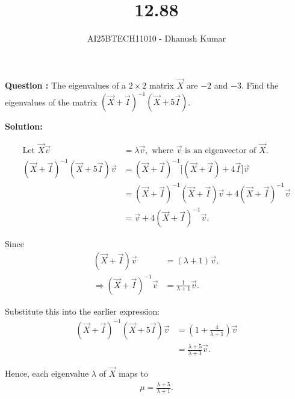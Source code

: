 \documentclass[journal]{IEEEtran}
\begin{document}
\title{12.88}
\author{AI25BTECH11010 - Dhanush Kumar}
\maketitle
\renewcommand{\thefigure}{\theenumi}
\renewcommand{\thetable}{\theenumi}

\textbf{Question :}  
The eigenvalues of a $2 \times 2$ matrix $\vec{X}$ are $-2$ and $-3$.  
Find the eigenvalues of the matrix $(\vec{X} + \vec{I})^{-1}(\vec{X} + 5\vec{I})$.
\begin{enumerate}[label=(\alph*)]}
		\begin{multicols}{2}
    \item $-3, -4$
    \item $-1, -2$
    \item $-1, -3$
    \item $-2, -4$
 \end{multicols}
\end{enumerate}

\textbf{Solution:}

\begin{align}
\text{Let } \vec{X}\vec{v} &= \lambda \vec{v}, \text{ where } \vec{v} \text{ is an eigenvector of } \vec{X}. \\[6pt]
(\vec{X} + \vec{I})^{-1}(\vec{X} + 5\vec{I})\vec{v} 
&= (\vec{X} + \vec{I})^{-1}\big[(\vec{X} + \vec{I}) + 4\vec{I}\big]\vec{v} \\[4pt]
&= (\vec{X} + \vec{I})^{-1}(\vec{X} + \vec{I})\vec{v} + 4(\vec{X} + \vec{I})^{-1}\vec{v} \\[4pt]
&= \vec{v} + 4(\vec{X} + \vec{I})^{-1}\vec{v}.
\end{align}

Since
\begin{align}
(\vec{X} + \vec{I})\vec{v} &= (\lambda + 1)\vec{v}, \\[4pt]
\Rightarrow (\vec{X} + \vec{I})^{-1}\vec{v} &= \frac{1}{\lambda + 1}\vec{v}.
\end{align}

Substitute this into the earlier expression:
\begin{align}
(\vec{X} + \vec{I})^{-1}(\vec{X} + 5\vec{I})\vec{v} 
&= \left( 1 + \frac{4}{\lambda + 1} \right)\vec{v} \\[4pt]
&= \frac{\lambda + 5}{\lambda + 1}\vec{v}.
\end{align}

Hence, each eigenvalue $\lambda$ of $\vec{X}$ maps to
\begin{align}
\mu = \frac{\lambda + 5}{\lambda + 1}.
\end{align}
\end{document}
